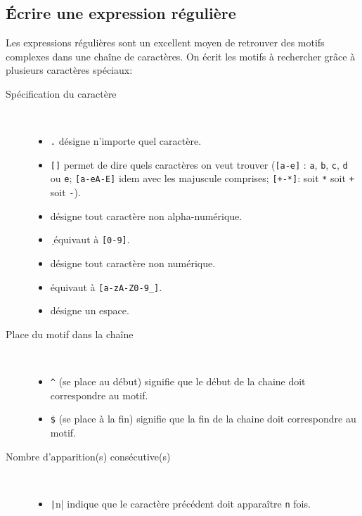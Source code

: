 \documentclass[a4paper, 10pt]{article}
\begin{document}
\subsection{Écrire une expression régulière}
Les expressions régulières sont un excellent moyen de retrouver des motifs complexes dans une chaîne de caractères. On écrit les motifs à rechercher grâce à plusieurs caractères spéciaux:
\begin{description}
    \item [Spécification du caractère]~
          \begin{itemize}
              \item \og\texttt{.}\fg{} désigne n'importe quel caractère.
              \item \og\texttt{[]}\fg{} permet de dire quels caractères on veut trouver (\texttt{[a-e]} : \texttt{a}, \texttt{b}, \texttt{c}, \texttt{d} ou \texttt{e}; \texttt{[a-eA-E]} idem avec les majuscule comprises; \texttt{[+-*]}: soit \texttt{*} soit \texttt{+} soit \texttt{-}).
              \item \og\texttt{\W}\fg{} désigne tout caractère non alpha-numérique.
              \item \og\texttt{\d}\fg{} équivaut à \texttt{[0-9]}.
              \item \og\texttt{\D}\fg{} désigne tout caractère non numérique.
              \item \og\texttt{\w}\fg{} équivaut à \texttt{[a-zA-Z0-9_]}.
              \item \og\texttt{\s}\fg{} désigne un espace.
          \end{itemize}
    \item [Place du motif dans la chaîne]~
          \begin{itemize}
              \item \og\texttt{^}\fg{} (se place au début) signifie que le début de la chaine doit correspondre au motif.
              \item \og\texttt{\$}\fg{} (se place à la fin) signifie que la fin de la chaine doit correspondre au motif.
          \end{itemize}
    \item [Nombre d'apparition(s) consécutive(s)]~
          \begin{itemize}
              \item \og\texttt|{n}|\fg{} indique que le caractère précédent doit apparaître \texttt{n} fois.

\end{itemize}
\end{description}
\end{document}

